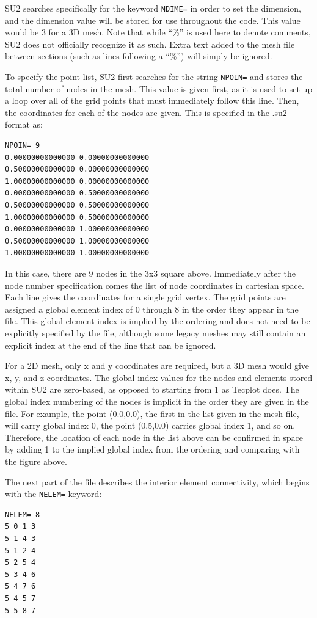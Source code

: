 \documentclass[12pt, a4paper, twoside]{article}
\begin{document}
SU2 searches specifically for the keyword \verb|NDIME=| in order to set the dimension, and the dimension value will be stored for use throughout the code. This value would be 3 for a 3D mesh. Note that while “\%” is used here to denote comments, SU2 does not officially recognize it as such. Extra text added to the mesh file between sections (such as lines following a “\%”) will simply be ignored.

To specify the point list, SU2 first searches for the string \verb|NPOIN=| and stores the total number of nodes in the mesh. This value is given first, as it is used to set up a loop over all of the grid points that must immediately follow this line. Then, the coordinates for each of the nodes are given. This is specified in the .su2 format as:

\begin{lstlisting}
NPOIN= 9
0.00000000000000 0.00000000000000
0.50000000000000 0.00000000000000
1.00000000000000 0.00000000000000
0.00000000000000 0.50000000000000
0.50000000000000 0.50000000000000
1.00000000000000 0.50000000000000
0.00000000000000 1.00000000000000
0.50000000000000 1.00000000000000
1.00000000000000 1.00000000000000
\end{lstlisting}


In this case, there are 9 nodes in the 3x3 square above. Immediately after the node number specification comes the list of node coordinates in cartesian space. Each line gives the coordinates for a single grid vertex. The grid points are assigned a global element index of 0 through 8 in the order they appear in the file. This global element index is implied by the ordering and does not need to be explicitly specified by the file, although some legacy meshes may still contain an explicit index at the end of the line that can be ignored.

For a 2D mesh, only x and y coordinates are required, but a 3D mesh would give x, y, and z coordinates. The global index values for the nodes and elements stored within SU2 are zero-based, as opposed to starting from 1 as Tecplot does. The global index numbering of the nodes is implicit in the order they are given in the file. For example, the point (0.0,0.0), the first in the list given in the mesh file, will carry global index 0, the point (0.5,0.0) carries global index 1, and so on. Therefore, the location of each node in the list above can be confirmed in space by adding 1 to the implied global index from the ordering and comparing with the figure above.

The next part of the file describes the interior element connectivity, which begins with the \verb|NELEM=| keyword:
\begin{lstlisting}
NELEM= 8
5 0 1 3
5 1 4 3
5 1 2 4
5 2 5 4
5 3 4 6
5 4 7 6
5 4 5 7
5 5 8 7
\end{lstlisting}
\end{document}
